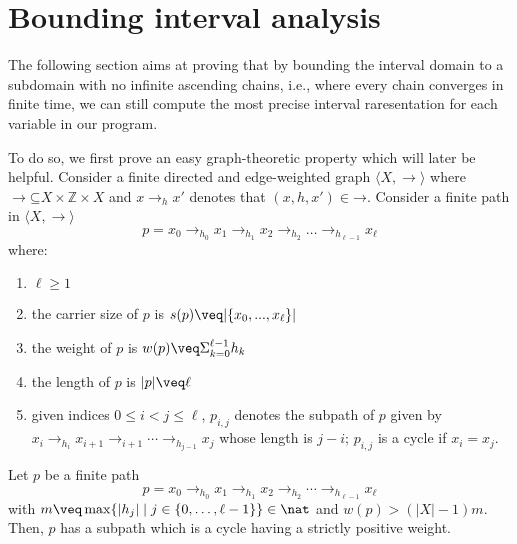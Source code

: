 \section{Bounding interval analysis}\label{sec:computing}
The following section aims at proving that by bounding the interval
domain to a subdomain with no infinite ascending chains, i.e., where
every chain converges in finite time, we can still compute the most
precise interval raresentation for each variable in our program.

 To do so, we first prove an easy graph-theoretic
property which will later be helpful.
Consider a finite directed and edge-weighted graph
\(\langle X,\to\rangle\) where
\(\to \mathord{\subseteq} X \times \mathbb{Z} \times X\) and
\(x \to_h x'\) denotes that \((x, h, x') \in \mathbin{\to}\). Consider
a finite path in \(\langle X,\to\rangle\)
\[p= x_0 \to_{h_0} x_1 \to_{h_1} x_2 \to_{h_2} \ldots \to_{h_{\ell-1}}
  x_{\ell}\] where:
\begin{enumerate}[label=(\roman*).]
\item \(\ell\geq 1\)
\item the carrier size of \(p\) is \(s(p) \veq |\{x_0,...,x_\ell\}|\)
\item the weight of \(p\) is \(w(p) \veq \Sigma_{k=0}^{\ell-1} h_k\)
\item the length of \(p\) is \(|p|\veq \ell\)
\item given indices \(0 \leq i < j \leq \ell\), \(p_{i,j}\) denotes
  the subpath of \(p\) given by
  \(x_i \to_{h_i} x_{i+1} \to_{i+1} \cdots \to_{h_{j-1}} x_j\) whose
  length is \(j-i\); \(p_{i,j}\) is a cycle if \(x_i=x_j\).
\end{enumerate}

\begin{lemma}
  \label{le:cycles}
  Let \(p\) be a finite path
  \[p = x_0 \to_{h_0} x_1 \to_{h_1} x_2 \to_{h_2} \cdots \to_{h_{\ell-1}} x_{\ell}\]
  with
  \(m \veq \max \{ |h_j| \mid j \in \{0, \ldots, \ell-1\}\}\in \nat\) and 
  \(w(p) > (|X|-1)m\). Then, \(p\) has a subpath which is a cycle having a 
  strictly positive weight.
\end{lemma}

